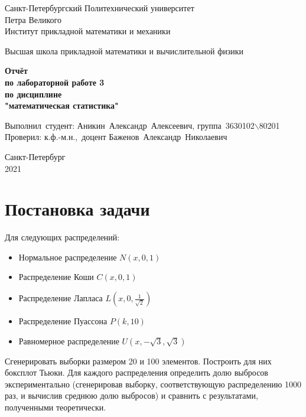 \documentclass[12pt,a4paper]{article}
\begin{document}
	
	\begin{titlepage}
		
		\begin{center}
			\begin{large}
				Санкт-Петербургский Политехнический университет\\ Петра Великого\\
				Институт прикладной математики и механики\\
			\end{large}
			\vspace{0.2cm}
			Высшая школа прикладной математики и вычислительной физики\\
			
		\end{center}
		
		\vspace{3cm}
		\begin{center}
			\textbf{Отчёт\\ по лабораторной работе 3\\ по дисциплине\\ "математическая статистика"}
		\end{center}
		
		\vspace{3cm}
		\vbox{%
			\hfill%
			\vbox{%
				\hbox{Выполнил студент:}%
				\hbox{\break}
				\hbox{Аникин Александр Алексеевич,}%
				\hbox{группа 3630102$\backslash$80201}%
				\hbox{\break}
				\hbox{\break}
				\hbox{Проверил:}
				\hbox{\break}
				\hbox{к.ф.-м.н., доцент}
				\hbox{Баженов Александр Николаевич}
			}%
		} 
		\vfill
		
		\begin{center}
			Санкт-Петербург\\2021
		\end{center}
		
	\end{titlepage}
	\tableofcontents
	\newpage
	
	\listoffigures
	\newpage
	
	\listoftables
	\newpage	
	
	\section{Постановка задачи}
	Для следующих распределений:
	\begin{itemize}
		\item Нормальное распределение $\textit{N}(\textit{x}, 0, 1)$
		\item Распределение Коши $\textit{C}(\textit{x}, 0, 1)$
		\item Распределение Лапласа $\textit{L}(\textit{x}, 0, \frac{1}{\sqrt{2}})$
		\item Распределение Пуассона $\textit{P}(\textit{k}, 10)$
		\item Равномерное распределение $\textit{U}(\textit{x}, -\sqrt{3}, \sqrt{3})$
	\end{itemize}
	Сгенерировать выборки размером 20 и 100 элементов.
	Построить для них боксплот Тьюки.
	Для каждого распределения определить долю выбросов экспериментально (сгенерировав выборку, соответствующую распределению 1000
	раз, и вычислив среднюю долю выбросов) и сравнить с результатами,
	полученными теоретически.
	
\end{document}
